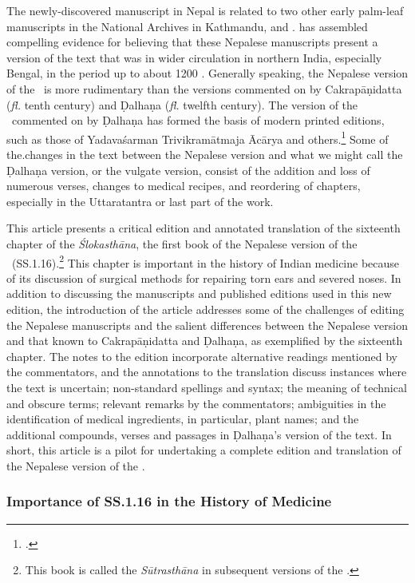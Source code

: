 The newly-discovered manuscript in Nepal is related to two other early palm-leaf
manuscripts in the National Archives in Kathmandu, 
and . \citet{kleb-2010,kleb-2021b} has 
assembled
compelling evidence for believing that these Nepalese manuscripts present a
version of the text that was in wider circulation in northern India, especially
Bengal, in the period up to about 1200 \AD. Generally speaking, the Nepalese
version of the \SS\ is more rudimentary than the versions commented on by
Cakrapāṇidatta (\emph{fl.} tenth century) and Ḍalhaṇa (\emph{fl.} twelfth
century).  The version of the \SS\ commented on by Ḍalhaṇa has formed the basis 
of
modern printed editions, such as those of Yadavaśarman Trivikramātmaja Ācārya 
and
others.\footcite{susr-trikamji1,vulgate,shar-susr}  Some of the.changes in the text 
between the Nepalese version and what we might call the Ḍalhaṇa version, or the 
vulgate version, consist of the addition and loss of numerous verses, changes to 
medical recipes, and reordering of chapters, especially in the Uttaratantra or last 
part of the work.

This article presents a critical edition and annotated translation of the sixteenth 
chapter of the \emph{Ślokasthāna}, the first book of the Nepalese version of the 
\SS\ (SS.1.16).\footnote{This book is called the \emph{Sūtrasthāna} in 
subsequent versions of the \SS.} This chapter is important in the history of Indian 
medicine because of its discussion of surgical methods for repairing torn ears and 
severed noses. In addition to discussing the manuscripts and published editions 
used in this new edition, the introduction of the article addresses some of the 
challenges of editing the Nepalese manuscripts and the salient differences 
between the Nepalese version and that known to Cakrapāṇidatta and Ḍalhaṇa, as 
exemplified by the sixteenth chapter. The notes to the edition incorporate 
alternative readings mentioned by the commentators, and the annotations to the 
translation discuss instances where the text is uncertain; non-standard spellings 
and syntax; the meaning of technical and obscure terms; relevant remarks by the 
commentators; ambiguities in the identification of medical ingredients, in 
particular, plant names; and the additional compounds, verses and passages in 
Ḍalhaṇa's version of the text. In short, this article is a pilot for undertaking a 
complete edition and translation of the Nepalese version of the \SS.


\subsubsection{Importance of SS.1.16 in the History of Medicine}


